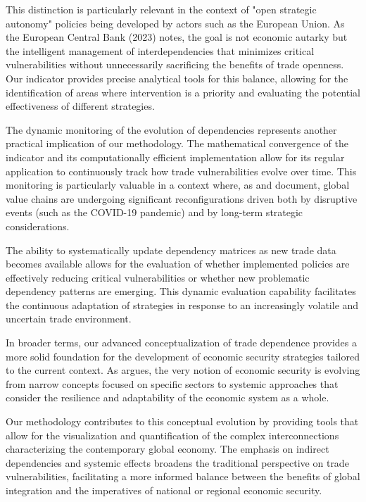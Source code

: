 \documentclass[final,1p,times,authoryear]{elsarticle}
\begin{document}
This distinction is particularly relevant in the context of "open strategic autonomy" policies being developed by actors such as the European Union. As the European Central Bank (2023) notes, the goal is not economic autarky but the intelligent management of interdependencies that minimizes critical vulnerabilities without unnecessarily sacrificing the benefits of trade openness. Our indicator provides precise analytical tools for this balance, allowing for the identification of areas where intervention is a priority and evaluating the potential effectiveness of different strategies.

The dynamic monitoring of the evolution of dependencies represents another practical implication of our methodology. The mathematical convergence of the indicator and its computationally efficient implementation allow for its regular application to continuously track how trade vulnerabilities evolve over time. This monitoring is particularly valuable in a context where, as \citet{Frohm2022} and \citet{Gunnella2022} document, global value chains are undergoing significant reconfigurations driven both by disruptive events (such as the COVID-19 pandemic) and by long-term strategic considerations.

The ability to systematically update dependency matrices as new trade data becomes available allows for the evaluation of whether implemented policies are effectively reducing critical vulnerabilities or whether new problematic dependency patterns are emerging. This dynamic evaluation capability facilitates the continuous adaptation of strategies in response to an increasingly volatile and uncertain trade environment.

In broader terms, our advanced conceptualization of trade dependence provides a more solid foundation for the development of economic security strategies tailored to the current context. As \citet{Balteanu2025} argues, the very notion of economic security is evolving from narrow concepts focused on specific sectors to systemic approaches that consider the resilience and adaptability of the economic system as a whole.

Our methodology contributes to this conceptual evolution by providing tools that allow for the visualization and quantification of the complex interconnections characterizing the contemporary global economy. The emphasis on indirect dependencies and systemic effects broadens the traditional perspective on trade vulnerabilities, facilitating a more informed balance between the benefits of global integration and the imperatives of national or regional economic security.
\end{document}
